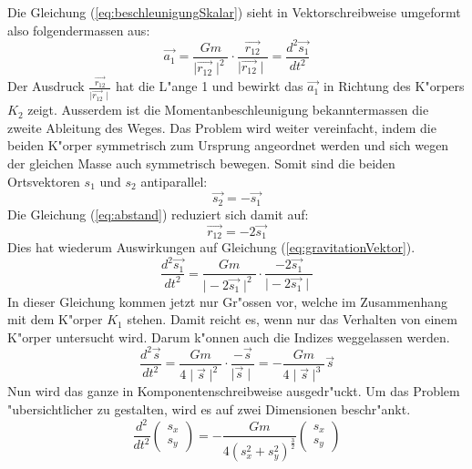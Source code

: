 \begin{refsection}
\begin{equation}
\end{equation}
Die Gleichung (\ref{eq:beschleunigungSkalar}) sieht in Vektorschreibweise umgeformt also folgendermassen aus:
\begin{equation} \label{eq:gravitationVektor}
\vec{a_1} =\frac{G m}{\mid \vec{r_{12}}\mid ^2}\cdot \frac{\vec{r_{12}}}{\mid \vec{r_{12}}\mid}=  \frac{d^2 \vec{s_1}}{dt^2}
\end{equation}
Der Ausdruck $\frac{\vec{r_{12}}}{\mid \vec{r_{12}}\mid}$ hat die L"ange 1 und bewirkt das $\vec{a_1}$ in Richtung des K"orpers $K_2$ zeigt.
Ausserdem ist die Momentanbeschleunigung bekanntermassen die zweite Ableitung des Weges. 
Das Problem wird weiter vereinfacht, indem die beiden K"orper symmetrisch zum Ursprung angeordnet werden und sich wegen der gleichen Masse auch symmetrisch bewegen.
Somit sind die beiden Ortsvektoren $s_1$ und $s_2$ antiparallel:
\begin{equation}
\vec{s_2}=-\vec{s_1}
\end{equation}
Die Gleichung (\ref{eq:abstand}) reduziert sich damit auf:
\begin{equation}
\vec{r_{12}}= -2\vec{s_1}
\end{equation}
Dies hat wiederum Auswirkungen auf Gleichung (\ref{eq:gravitationVektor}).
\begin{equation}
\frac{d^2 \vec{s_1}}{dt^2} =\frac{G m}{\mid -2\vec{s_{1}}\mid ^2}\cdot \frac{-2\vec{s_{1}}}{\mid -2\vec{s_{1}}\mid}
\end{equation}
In dieser Gleichung kommen jetzt nur Gr"ossen vor, welche im Zusammenhang mit dem K"orper $K_1$ stehen.
Damit reicht es, wenn nur das Verhalten von einem K"orper untersucht wird. 
Darum k"onnen auch die Indizes weggelassen werden.
\begin{equation}
\frac{d^2\vec{s}}{dt^2}=\frac{G m}{4\mid\vec{s}\mid ^2}\cdot\frac{-\vec{s}}{\mid\vec{s}\mid}=-\frac{G m}{4\mid\vec{s}\mid ^3}{\vec{s}}
\end{equation}
Nun wird das ganze in Komponentenschreibweise ausgedr"uckt.
Um das Problem "ubersichtlicher zu gestalten, wird es auf zwei Dimensionen beschr"ankt.
\begin{equation}
\frac{d^2}{dt^2}
\begin{pmatrix}
s_x \\ s_y
\end{pmatrix}
=
-\frac{G m}{4(s_x^2 + s_y^2)^\frac32}
\begin{pmatrix}
s_x \\ s_y
\end{pmatrix}
\end{equation}

\end{refsection}
